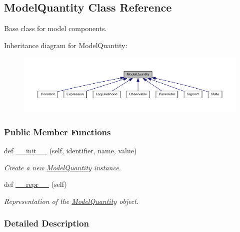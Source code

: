 \hypertarget{classamici_1_1ode__export_1_1_model_quantity}{}\subsection{Model\+Quantity Class Reference}
\label{classamici_1_1ode__export_1_1_model_quantity}


Base class for model components.  




Inheritance diagram for Model\+Quantity\+:
\nopagebreak
\begin{figure}[H]
\begin{center}
\leavevmode
\includegraphics[width=350pt]{classamici_1_1ode__export_1_1_model_quantity__inherit__graph}
\end{center}
\end{figure}
\subsubsection*{Public Member Functions}
\begin{DoxyCompactItemize}
\item 
def \mbox{\hyperlink{classamici_1_1ode__export_1_1_model_quantity_a258843a3afab00b576ccf386e8673a64}{\+\_\+\+\_\+init\+\_\+\+\_\+}} (self, identifier, name, value)
\begin{DoxyCompactList}\small\item\em Create a new \mbox{\hyperlink{classamici_1_1ode__export_1_1_model_quantity}{Model\+Quantity}} instance. \end{DoxyCompactList}\item 
def \mbox{\hyperlink{classamici_1_1ode__export_1_1_model_quantity_a9a47563093dfc5ba12274b66e368920c}{\+\_\+\+\_\+repr\+\_\+\+\_\+}} (self)
\begin{DoxyCompactList}\small\item\em Representation of the \mbox{\hyperlink{classamici_1_1ode__export_1_1_model_quantity}{Model\+Quantity}} object. \end{DoxyCompactList}\end{DoxyCompactItemize}


\subsubsection{Detailed Description}


